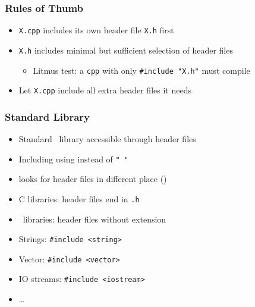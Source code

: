 \documentclass{../ucll-slides}
\begin{document}
\begin{frame}
  \frametitle{Rules of Thumb}
  \begin{itemize}
    \item {\tt X.cpp} includes its own header file {\tt X.h} first
    \item {\tt X.h} includes minimal but sufficient selection of header files
      \begin{itemize}
        \item Litmus test: a {\tt cpp} with only {\tt \#include "X.h"} must compile
      \end{itemize}
    \item Let {\tt X.cpp} include all extra header files it needs
  \end{itemize}
\end{frame}

\begin{frame}
  \frametitle{Standard Library}
  \begin{itemize}
    \item Standard \cpp\ library accessible through header files
    \item Including using {\tt < >} instead of {\tt " "}
    \item {\tt < >} looks for header files in different place ()
    \item C libraries: header files end in {\tt .h}
    \item \cpp\ libraries: header files without extension
    \item Strings: {\tt \#include <string>}
    \item Vector: {\tt \#include <vector>}
    \item IO streams: {\tt \#include <iostream>}
    \item \dots
  \end{itemize}
\end{frame}
\end{document}
